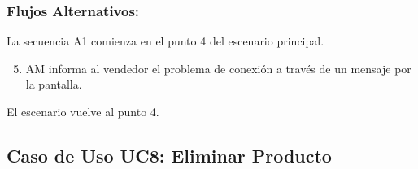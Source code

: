 \begin{framed}
\subsubsection{Flujos Alternativos: }

La secuencia A1 comienza en el punto 4 del escenario principal.
\begin{enumerate}
    \setcounter{enumi}{4}
    \item AM informa al vendedor el problema de conexión a través de un mensaje por la pantalla.
\end{enumerate}
El escenario vuelve al punto 4.

\end{framed}



\subsection{Caso de Uso UC8: Eliminar Producto}

